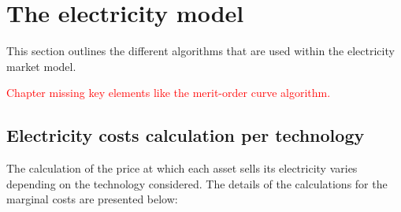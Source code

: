 \section{The electricity model}
\label{sec:ImplementationElec}

This section outlines the different algorithms that are used within the electricity market model.

\textcolor{red}{Chapter missing key elements like the merit-order curve algorithm.}

\subsection{Electricity costs calculation per technology}


The calculation of the price at which each asset sells its electricity varies depending on the technology considered. The details of the calculations for the marginal costs are presented below:

